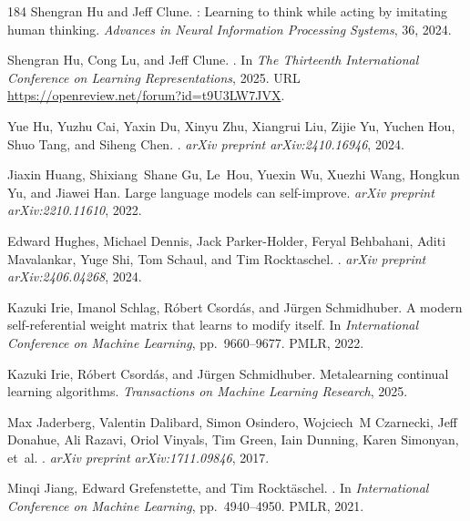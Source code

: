 \begin{thebibliography}{184}
Shengran Hu and Jeff Clune.
: Learning to think while acting by imitating human
  thinking.
\newblock \emph{Advances in Neural Information Processing Systems}, 36, 2024.

Shengran Hu, Cong Lu, and Jeff Clune.
.
\newblock In \emph{The Thirteenth International Conference on Learning
  Representations}, 2025.
\newblock URL \url{https://openreview.net/forum?id=t9U3LW7JVX}.

Yue Hu, Yuzhu Cai, Yaxin Du, Xinyu Zhu, Xiangrui Liu, Zijie Yu, Yuchen Hou,
  Shuo Tang, and Siheng Chen.
.
\newblock \emph{arXiv preprint arXiv:2410.16946}, 2024.

Jiaxin Huang, Shixiang~Shane Gu, Le~Hou, Yuexin Wu, Xuezhi Wang, Hongkun Yu,
  and Jiawei Han.
\newblock Large language models can self-improve.
\newblock \emph{arXiv preprint arXiv:2210.11610}, 2022.

Edward Hughes, Michael Dennis, Jack Parker-Holder, Feryal Behbahani, Aditi
  Mavalankar, Yuge Shi, Tom Schaul, and Tim Rocktaschel.
.
\newblock \emph{arXiv preprint arXiv:2406.04268}, 2024.

Kazuki Irie, Imanol Schlag, R{\'o}bert Csord{\'a}s, and J{\"u}rgen Schmidhuber.
\newblock A modern self-referential weight matrix that learns to modify itself.
\newblock In \emph{International Conference on Machine Learning}, pp.\
  9660--9677. PMLR, 2022.

Kazuki Irie, R{\'o}bert Csord{\'a}s, and J{\"u}rgen Schmidhuber.
\newblock Metalearning continual learning algorithms.
\newblock \emph{Transactions on Machine Learning Research}, 2025.

Max Jaderberg, Valentin Dalibard, Simon Osindero, Wojciech~M Czarnecki, Jeff
  Donahue, Ali Razavi, Oriol Vinyals, Tim Green, Iain Dunning, Karen Simonyan,
  et~al.
.
\newblock \emph{arXiv preprint arXiv:1711.09846}, 2017.

Minqi Jiang, Edward Grefenstette, and Tim Rockt{\"a}schel.
.
\newblock In \emph{International Conference on Machine Learning}, pp.\
  4940--4950. PMLR, 2021.


\end{thebibliography}
